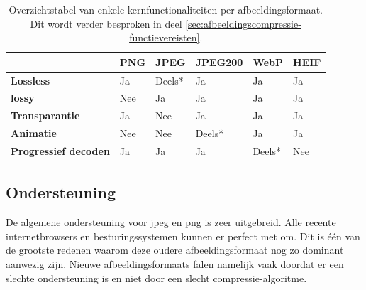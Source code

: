 \begin{table}[]
	\begin{tabular}{|l|l|l|l|l|l|}
		\hline
		& \textbf{PNG}                   & \textbf{JPEG}                  & \textbf{JPEG200}               & \textbf{WebP}                  & \textbf{HEIF}               \\ \hline
		\textbf{Lossless}            & \cellcolor[HTML]{32CB00}Ja     & \cellcolor[HTML]{CB0000}Deels* & \cellcolor[HTML]{32CB00}Ja     & \cellcolor[HTML]{32CB00}Ja     & \cellcolor[HTML]{32CB00}Ja  \\ \hline
		\textbf{lossy}               & \cellcolor[HTML]{CB0000}Nee    & \cellcolor[HTML]{32CB00}Ja     & \cellcolor[HTML]{32CB00}Ja     & \cellcolor[HTML]{32CB00}Ja     & \cellcolor[HTML]{32CB00}Ja  \\ \hline
		\textbf{Transparantie}       & \cellcolor[HTML]{32CB00}Ja     & \cellcolor[HTML]{CB0000}Nee    & \cellcolor[HTML]{32CB00}Ja     & \cellcolor[HTML]{32CB00}Ja     & \cellcolor[HTML]{32CB00}Ja  \\ \hline
		\textbf{Animatie}            & \cellcolor[HTML]{CB0000}Nee  & \cellcolor[HTML]{CB0000}Nee    & \cellcolor[HTML]{9B9B9B}Deels* & \cellcolor[HTML]{32CB00}Ja     & \cellcolor[HTML]{32CB00}Ja  \\ \hline
		\textbf{Progressief decoden} & \cellcolor[HTML]{32CB00}Ja     & \cellcolor[HTML]{32CB00}Ja     & \cellcolor[HTML]{32CB00}Ja     & \cellcolor[HTML]{9B9B9B}Deels* & \cellcolor[HTML]{CB0000}Nee \\ \hline
	\end{tabular}
	\caption{Overzichtstabel van enkele kernfunctionaliteiten per \gls{afbeeldingsformaat}. Dit wordt verder besproken in deel \ref{sec:afbeeldingscompressie-functievereisten}.}
	\label{fig:overzichtstabel-afbeeldingsformaten-functies}
\end{table}

\subsection{Ondersteuning}
\label{sec:afbeeldingscompressie-ondersteuning}

De algemene ondersteuning voor \gls{jpeg} en \gls{png} is zeer uitgebreid. Alle recente internetbrowsers en besturingssystemen kunnen er perfect met om. Dit is één van de grootste redenen waarom deze oudere \gls{afbeeldingsformaat} nog zo dominant aanwezig zijn. Nieuwe \glspl{afbeeldingsformaat} falen namelijk vaak doordat er een slechte ondersteuning is en niet door een slecht \gls{compressie-algoritme}.

